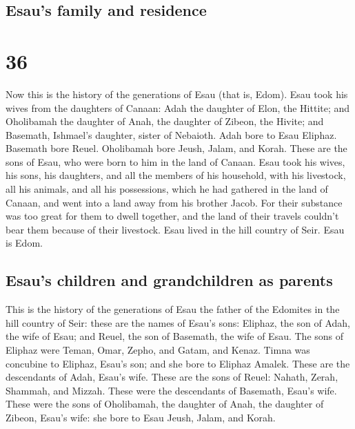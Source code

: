 \hypertarget{esaus-family-and-residence}{%
\subsection{Esau's family and
residence}\label{esaus-family-and-residence}}

\hypertarget{section-35}{%
\section{36}\label{section-35}}

 Now this is the history of the generations of Esau (that
is, Edom).  Esau took his wives from the daughters of
Canaan: Adah the daughter of Elon, the Hittite; and Oholibamah the
daughter of Anah, the daughter of Zibeon, the Hivite;  and
Basemath, Ishmael's daughter, sister of Nebaioth.  Adah
bore to Esau Eliphaz. Basemath bore Reuel.  Oholibamah
bore Jeush, Jalam, and Korah. These are the sons of Esau, who were born
to him in the land of Canaan.  Esau took his wives, his
sons, his daughters, and all the members of his household, with his
livestock, all his animals, and all his possessions, which he had
gathered in the land of Canaan, and went into a land away from his
brother Jacob.  For their substance was too great for them
to dwell together, and the land of their travels couldn't bear them
because of their livestock.  Esau lived in the hill
country of Seir. Esau is Edom.

\hypertarget{esaus-children-and-grandchildren-as-parents}{%
\subsection{Esau's children and grandchildren as
parents}\label{esaus-children-and-grandchildren-as-parents}}

 This is the history of the generations of Esau the father
of the Edomites in the hill country of Seir:  these are
the names of Esau's sons: Eliphaz, the son of Adah, the wife of Esau;
and Reuel, the son of Basemath, the wife of Esau.  The
sons of Eliphaz were Teman, Omar, Zepho, and Gatam, and Kenaz.
 Timna was concubine to Eliphaz, Esau's son; and she bore
to Eliphaz Amalek. These are the descendants of Adah, Esau's wife.
 These are the sons of Reuel: Nahath, Zerah, Shammah, and
Mizzah. These were the descendants of Basemath, Esau's wife.
 These were the sons of Oholibamah, the daughter of Anah,
the daughter of Zibeon, Esau's wife: she bore to Esau Jeush, Jalam, and
Korah.

